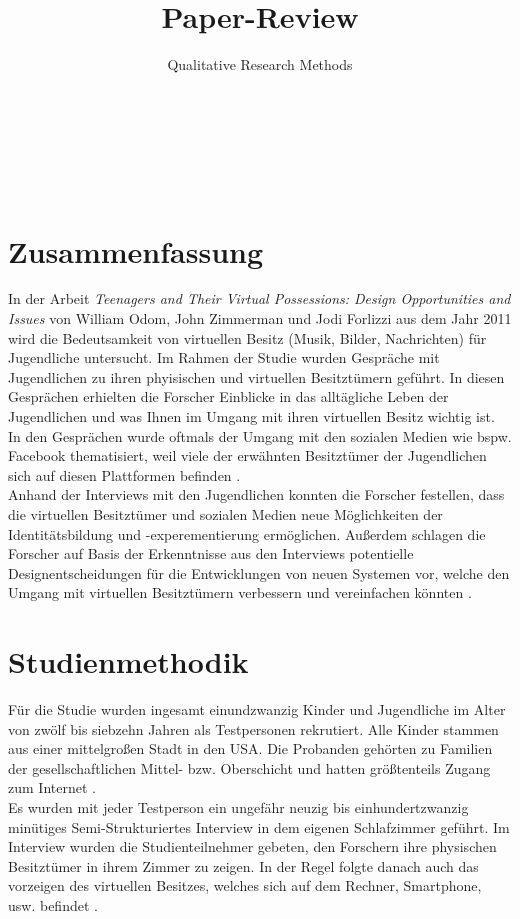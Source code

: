 \documentclass{hsflensburg}
\title{Paper-Review}
\subtitle{Qualitative Research Methods}
\author{
	\name{Tom Hartelt}\\
	\institution{Hochschule Flensburg}
	\and
	\name{Martin Hermannsen}\\
	\institution{Hochschule Flensburg}
	\and
	\name{Michael Frank}\\
	\institution{Hochschule Flensburg}
}
\begin{document}
	\maketitle
 	 \tableofcontents

  \pagebreak
	
	\section{Zusammenfassung}
	In der Arbeit \textit{Teenagers and Their Virtual Possessions: Design Opportunities and Issues} von
 	William Odom, John Zimmerman und Jodi Forlizzi aus dem Jahr 2011 wird die Bedeutsamkeit 
	von virtuellen Besitz (Musik, Bilder, Nachrichten) für Jugendliche untersucht. Im Rahmen der 
	Studie wurden Gespräche mit  Jugendlichen zu ihren phyisischen und virtuellen Besitztümern 
	geführt. In diesen Gesprächen erhielten die Forscher Einblicke in das alltägliche Leben der 
	Jugendlichen und was Ihnen im  Umgang mit ihren virtuellen Besitz wichtig ist. In den Gesprächen
	wurde oftmals der Umgang mit den sozialen Medien wie bspw. Facebook thematisiert, weil
	viele der erwähnten Besitztümer der Jugendlichen sich auf diesen Plattformen befinden 
	\cite{odom2011teenagers}. \\

	Anhand der Interviews mit den Jugendlichen konnten die Forscher festellen, dass die 
	virtuellen Besitztümer und sozialen Medien neue Möglichkeiten der Identitätsbildung 
	und -experementierung ermöglichen. Außerdem schlagen die Forscher auf Basis der 
	Erkenntnisse aus den Interviews potentielle Designentscheidungen für die 
	Entwicklungen von neuen Systemen vor, welche den Umgang mit virtuellen 
	Besitztümern verbessern und vereinfachen könnten \cite{odom2011teenagers}. 


	\section{Studienmethodik}
	Für die Studie wurden ingesamt einundzwanzig Kinder und Jugendliche im Alter
	von zwölf bis siebzehn Jahren als Testpersonen rekrutiert. Alle Kinder stammen
	aus einer mittelgroßen Stadt in den USA. Die Probanden gehörten zu Familien
	der gesellschaftlichen Mittel- bzw. Oberschicht und hatten größtenteils Zugang
	zum Internet \cite{odom2011teenagers}. \\

	Es wurden mit jeder Testperson ein ungefähr neuzig bis einhundertzwanzig minütiges
	Semi-Strukturiertes Interview in dem eigenen Schlafzimmer geführt. Im Interview
	wurden die Studienteilnehmer gebeten, den Forschern ihre physischen Besitztümer
	in ihrem Zimmer zu zeigen. In der Regel folgte danach auch das vorzeigen des
	virtuellen Besitzes, welches sich auf dem Rechner, Smartphone, usw. befindet 
	\cite{odom2011teenagers}. \\
\end{document}

